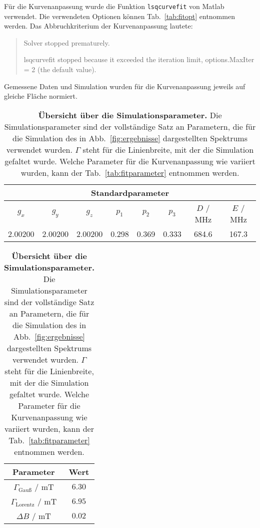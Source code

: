\documentclass{article}
\newcommand{\matlab}{\textsf{Matlab}}
\begin{document}
\clearpage


Für die Kurvenanpassung wurde die Funktion \texttt{lsqcurvefit} von \matlab{} verwendet. Die verwendeten Optionen können Tab.~\ref{tab:fitopt} entnommen werden. Das Abbruchkriterium der Kurvenanpassung lautete:

\begin{quote}\small
\ttfamily
Solver stopped prematurely.

lsqcurvefit stopped because it exceeded the iteration limit,
options.MaxIter = 2 (the default value).
\end{quote}

Gemessene Daten und Simulation wurden für die Kurvenanpassung jeweils auf gleiche Fläche normiert.

\begin{table}[h]
\caption{\textbf{Übersicht über die Simulationsparameter.} Die Simulationsparameter sind der vollständige Satz an Parametern, die für die Simulation des in Abb.~\ref{fig:ergebnisse} dargestellten Spektrums verwendet wurden. $\Gamma$ steht für die Linienbreite, mit der die Simulation gefaltet wurde. Welche Parameter für die Kurvenanpassung wie variiert wurden, kann der Tab.~\ref{tab:fitparameter} entnommen werden.}
\label{tab:simparameter}
\centering
\begin{tabular}{cccccccc} 
\toprule
\multicolumn{8}{c}{\textbf{Standardparameter} }
\\
\midrule 
$g_x$      & $g_y$      & $g_z$      & $p_1$   & $p_2$   & $p_3$   & $D$ / MHz & $E$ / MHz \\
2.00200 & 2.00200 & 2.00200 & 0.298 & 0.369 & 0.333 &   684.6  &   167.3     \\ 
\bottomrule
\end{tabular}

\begin{tabular}{cc}
\toprule
\textbf{Parameter} & \textbf{Wert}
\\
\midrule

$\Gamma_\text{Gauß}$ / mT & $6.30$
\\

$\Gamma_\text{Lorentz}$ / mT & $6.95$
\\

$\Delta B$ / mT & $0.02$
\\

\bottomrule
\end{tabular}
\end{table}
\end{document}
